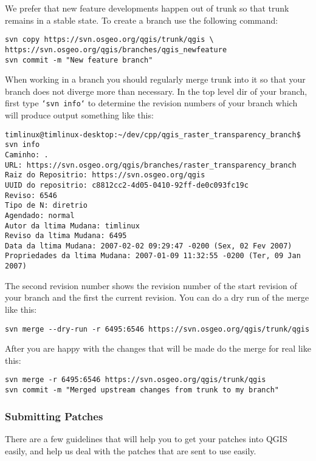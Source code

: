 We prefer that new feature developments happen out of trunk so that trunk
remains in a stable state. To create a branch use the following command:

\begin{verbatim}
svn copy https://svn.osgeo.org/qgis/trunk/qgis \
https://svn.osgeo.org/qgis/branches/qgis_newfeature
svn commit -m "New feature branch"
\end{verbatim}

When working in a branch you should regularly merge trunk into it so that your
branch does not diverge more than necessary. In the top level dir of your
branch, first type \texttt{`svn info`} to determine the revision numbers of your
branch which will produce output something like this:

\begin{verbatim}
timlinux@timlinux-desktop:~/dev/cpp/qgis_raster_transparency_branch$ svn info
Caminho: .
URL: https://svn.osgeo.org/qgis/branches/raster_transparency_branch
Raiz do Repositrio: https://svn.osgeo.org/qgis
UUID do repositrio: c8812cc2-4d05-0410-92ff-de0c093fc19c
Reviso: 6546
Tipo de N: diretrio
Agendado: normal
Autor da ltima Mudana: timlinux
Reviso da ltima Mudana: 6495
Data da ltima Mudana: 2007-02-02 09:29:47 -0200 (Sex, 02 Fev 2007)
Propriedades da ltima Mudana: 2007-01-09 11:32:55 -0200 (Ter, 09 Jan 2007)
\end{verbatim}

The second revision number shows the revision number of the start revision of
your branch and the first the current revision. You can do a dry run of the
merge like this:

\begin{verbatim}
svn merge --dry-run -r 6495:6546 https://svn.osgeo.org/qgis/trunk/qgis
\end{verbatim}

After you are happy with the changes that will be made do the merge for real
like this:

\begin{verbatim}
svn merge -r 6495:6546 https://svn.osgeo.org/qgis/trunk/qgis
svn commit -m "Merged upstream changes from trunk to my branch"
\end{verbatim}

\subsubsection{Submitting Patches}
There are a few guidelines that will help you to get your patches into QGIS
easily, and help us deal with the patches that are sent to use easily.

